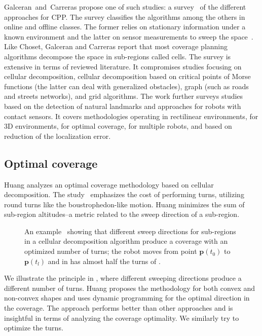 Galceran~and~Carreras propose one of such studies: a survey~\citep{galceran2013survey} of the different approaches for CPP. The survey classifies the algorithms among the others in online and offline classes. The former relies on stationary information under a known environment and the latter on sensor measurements to sweep the space~\citep{galceran2013survey}. Like Choset, Galceran and Carreras report that most coverage planning algorithms decompose the space in sub-regions called cells. The survey is extensive in terms of reviewed literature. It compromises studies focusing on cellular decomposition, cellular decomposition based on critical points of Morse functions (the latter can deal with generalized obstacles), graph (such as roads and streets networks), and grid algorithms. The work further surveys studies based on the detection of natural landmarks and approaches for robots with contact sensors. It covers methodologies operating in rectilinear environments, for 3D environments, for optimal coverage, for multiple robots, and based on reduction of the localization error.

\subsection{Optimal coverage}
\label{sec:opti-cov}

Huang analyzes an optimal coverage methodology based on cellular decomposition. The study~\citep{huang2001optimal} emphasizes the cost of performing turns, utilizing round turns like the boustrophedon-like motion. Huang minimizes the sum of sub-region altitudes--a metric related to the sweep direction of a sub-region. 
\begin{figure}[h]
  \centering
  \selectfont
  
  \caption[Turn optimal coverage with different sweep directions for each sub-region]{An example~\citep{huang2001optimal} showing that different sweep directions for sub-regions in a cellular decomposition algorithm produce a coverage with an optimized number of turns; the robot moves from point $\mathbf{p}(t_0)$ to $\mathbf{p}(t_l)$ and in  has almost half the turns of .}
  \label{fig:huang}
\end{figure}
We illustrate the principle in , where different sweeping directions produce a different number of turns. Huang proposes the methodology for both convex and non-convex shapes and uses dynamic programming for the optimal direction in the coverage. The approach performs better than other approaches 
and is insightful in terms of analyzing the coverage optimality. We similarly try to optimize the turns.

